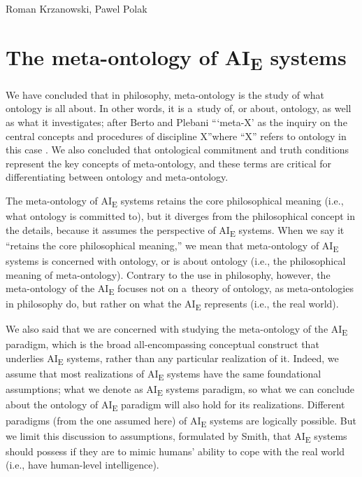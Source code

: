 \begin{artengenv2auth}{Roman Krzanowski, Pawel Polak}
\section*{The meta-ontology of AI\textsubscript{E} systems}
We have concluded that in philosophy, meta-ontology is the study of what ontology is all about. In other words, it is a~study of, or about, ontology, as well as what it investigates; after Berto and Plebani ``‘meta-X' as the inquiry on the central concepts and procedures of discipline X''where ``X'' refers to ontology in this case
\parencite[][p.13]{berto_ontology_2015}. %
 We also concluded that ontological commitment and truth conditions represent the key concepts of meta-ontology, and these terms are critical for differentiating between ontology and meta-ontology.

The meta-ontology of AI\textsubscript{E} systems retains the core philosophical meaning (i.e., what ontology is committed to), but it diverges from the philosophical concept in the details, because it assumes the perspective of AI\textsubscript{E} systems. When we say it ``retains the core philosophical meaning,'' we mean that meta-ontology of AI\textsubscript{E} systems is concerned with ontology, or is about ontology (i.e., the philosophical meaning of meta-ontology). Contrary to the use in philosophy, however, the meta-ontology of the AI\textsubscript{E} focuses not on a~theory of ontology, as meta-ontologies in philosophy do, but rather on what the AI\textsubscript{E} represents (i.e., the real world).

We also said that we are concerned with studying the meta-ontology of the AI\textsubscript{E} paradigm, which is the broad all-encompassing conceptual construct that underlies AI\textsubscript{E} systems, rather than any particular realization of it. Indeed, we assume that most realizations of AI\textsubscript{E} systems have the same foundational assumptions; what we denote as AI\textsubscript{E} systems paradigm, so what we can conclude about the ontology of AI\textsubscript{E} paradigm will also hold for its realizations. Different paradigms (from the one assumed here) of AI\textsubscript{E} systems are logically possible. But we limit this discussion to assumptions, formulated by Smith, that AI\textsubscript{E} systems should possess if they are to mimic humans' ability to cope with the real world (i.e., have human-level intelligence).


\end{artengenv2auth}
